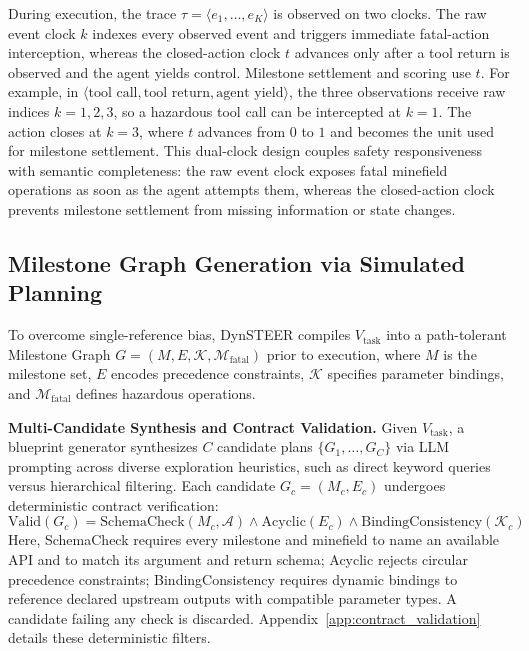 During execution, the trace $\tau = \langle e_1, \dots, e_K \rangle$ is observed on two clocks. 
The raw event clock $k$ indexes every observed event and triggers immediate fatal-action interception, whereas the closed-action clock $t$ advances only after a tool return is observed and the agent yields control. Milestone settlement and scoring use $t$. 
For example, in $\langle \text{tool call}, \text{tool return}, \text{agent yield} \rangle$, the three observations receive raw indices $k=1,2,3$, so a hazardous tool call can be intercepted at $k=1$. 
The action closes at $k=3$, where $t$ advances from $0$ to $1$ and becomes the unit used for milestone settlement. 
This dual-clock design couples safety responsiveness with semantic completeness: the raw event clock exposes fatal minefield operations as soon as the agent attempts them, whereas the closed-action clock prevents milestone settlement from missing information or state changes.

\subsection{Milestone Graph Generation via Simulated Planning}
\label{sec:blueprint_compilation}
To overcome single-reference bias, DynSTEER compiles $V_{\text{task}}$ into a path-tolerant Milestone Graph $G = (M, E, \mathcal{K}, \mathcal{M}_{\text{fatal}})$ prior to execution, where $M$ is the milestone set, $E$ encodes precedence constraints, $\mathcal{K}$ specifies parameter bindings, and $\mathcal{M}_{\text{fatal}}$ defines hazardous operations.

\textbf{Multi-Candidate Synthesis and Contract Validation.} Given $V_{\text{task}}$, a blueprint generator synthesizes $C$ candidate plans $\{G_1, \dots, G_C\}$ via LLM prompting across diverse exploration heuristics, such as direct keyword queries versus hierarchical filtering. Each candidate $G_c = (M_c, E_c)$ undergoes deterministic contract verification:
\begin{equation}
    \text{Valid}(G_c) = \text{SchemaCheck}(M_c, \mathcal{A}) \land \text{Acyclic}(E_c) \land \text{BindingConsistency}(\mathcal{K}_c)
    \label{eq:valid_gc}
\end{equation}
Here, SchemaCheck requires every milestone and minefield to name an available API and to match its argument and return schema; Acyclic rejects circular precedence constraints; BindingConsistency requires dynamic bindings to reference declared upstream outputs with compatible parameter types. A candidate failing any check is discarded. Appendix~\ref{app:contract_validation} details these deterministic filters.

